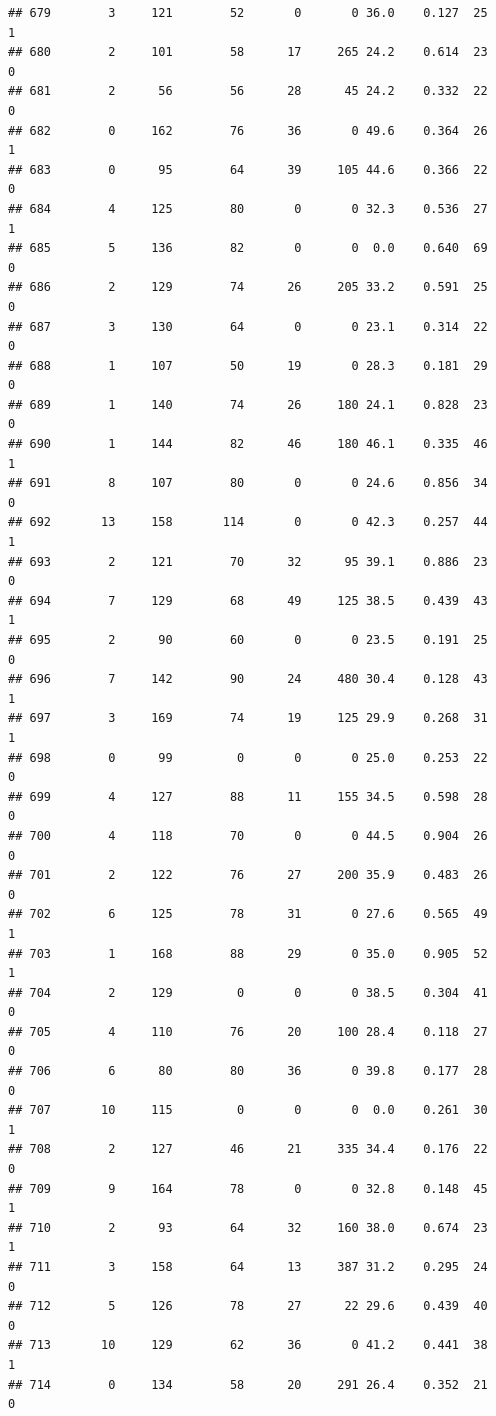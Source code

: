 \documentclass[11pt, a4paper]{article}\usepackage[]{graphicx}\usepackage[]{xcolor}
\makeatletter
\newenvironment{kframe}{%
 \def\at@end@of@kframe{}%
 \ifinner\ifhmode%
  \def\at@end@of@kframe{\end{minipage}}%
  \begin{minipage}{\columnwidth}%
 \fi\fi%
 \def\FrameCommand##1{\hskip\@totalleftmargin \hskip-\fboxsep
 \colorbox{shadecolor}{##1}\hskip-\fboxsep
     \hskip-\linewidth \hskip-\@totalleftmargin \hskip\columnwidth}%
 \MakeFramed {\advance\hsize-\width
   \@totalleftmargin\z@ \linewidth\hsize
   \@setminipage}}%
 {\par\unskip\endMakeFramed%
 \at@end@of@kframe}
\newenvironment{knitrout}{}{} %
\makeatother
\begin{document}
\begin{knitrout}
\begin{kframe}
\begin{verbatim}
## 679        3     121        52       0       0 36.0    0.127  25    1
## 680        2     101        58      17     265 24.2    0.614  23    0
## 681        2      56        56      28      45 24.2    0.332  22    0
## 682        0     162        76      36       0 49.6    0.364  26    1
## 683        0      95        64      39     105 44.6    0.366  22    0
## 684        4     125        80       0       0 32.3    0.536  27    1
## 685        5     136        82       0       0  0.0    0.640  69    0
## 686        2     129        74      26     205 33.2    0.591  25    0
## 687        3     130        64       0       0 23.1    0.314  22    0
## 688        1     107        50      19       0 28.3    0.181  29    0
## 689        1     140        74      26     180 24.1    0.828  23    0
## 690        1     144        82      46     180 46.1    0.335  46    1
## 691        8     107        80       0       0 24.6    0.856  34    0
## 692       13     158       114       0       0 42.3    0.257  44    1
## 693        2     121        70      32      95 39.1    0.886  23    0
## 694        7     129        68      49     125 38.5    0.439  43    1
## 695        2      90        60       0       0 23.5    0.191  25    0
## 696        7     142        90      24     480 30.4    0.128  43    1
## 697        3     169        74      19     125 29.9    0.268  31    1
## 698        0      99         0       0       0 25.0    0.253  22    0
## 699        4     127        88      11     155 34.5    0.598  28    0
## 700        4     118        70       0       0 44.5    0.904  26    0
## 701        2     122        76      27     200 35.9    0.483  26    0
## 702        6     125        78      31       0 27.6    0.565  49    1
## 703        1     168        88      29       0 35.0    0.905  52    1
## 704        2     129         0       0       0 38.5    0.304  41    0
## 705        4     110        76      20     100 28.4    0.118  27    0
## 706        6      80        80      36       0 39.8    0.177  28    0
## 707       10     115         0       0       0  0.0    0.261  30    1
## 708        2     127        46      21     335 34.4    0.176  22    0
## 709        9     164        78       0       0 32.8    0.148  45    1
## 710        2      93        64      32     160 38.0    0.674  23    1
## 711        3     158        64      13     387 31.2    0.295  24    0
## 712        5     126        78      27      22 29.6    0.439  40    0
## 713       10     129        62      36       0 41.2    0.441  38    1
## 714        0     134        58      20     291 26.4    0.352  21    0

\end{verbatim}
\end{kframe}
\end{knitrout}
\end{document}
